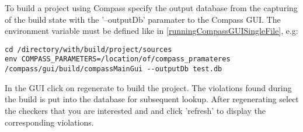 To build a project using Compass specify the output database from the capturing of the build state with the
'--outputDb' paramater to the Compass GUI. The environment variable must be defined like in \ref{runningCompassGUISingleFile}, e.g:
\begin{verbatim}
cd /directory/with/build/project/sources
env COMPASS_PARAMETERS=/location/of/compass_pramateres   /compass/gui/build/compassMainGui --outputDb test.db
\end{verbatim}
In the GUI click on regenerate to build the project. The violations found during the build is put into the database
for subsequent lookup. After regenerating select the checkers that you are interested and and click 'refresh' to display the corresponding violations.




